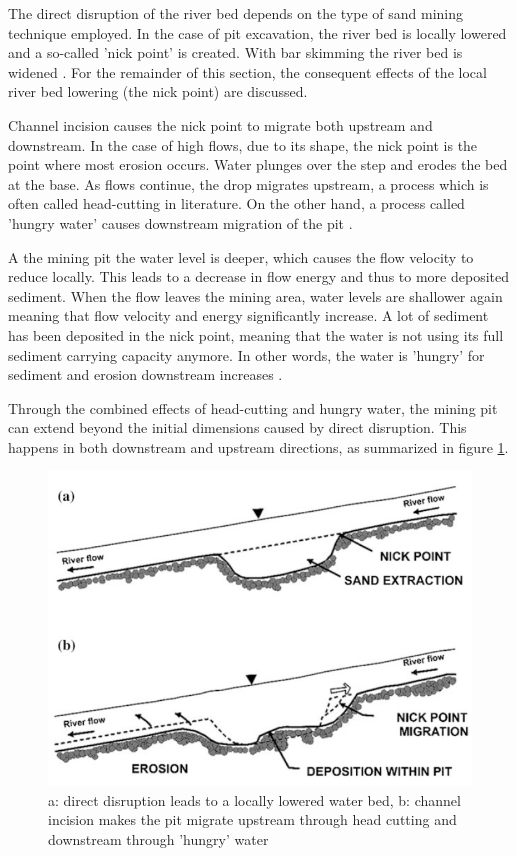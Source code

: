 The direct disruption of the river bed depends on the type of sand mining technique employed. In the case of pit excavation, the river bed is locally lowered and a so-called 'nick point' is created. With bar skimming the river bed is widened \autocite{sand-mining-boek}. For the remainder of this section, the consequent effects of the local river bed lowering (the nick point) are discussed.

Channel incision causes the nick point to migrate both upstream and downstream. In the case of high flows, due to its shape, the nick point is the point where most erosion occurs. Water plunges over the step and erodes the bed at the base. As flows continue, the drop migrates upstream, a process which is often called head-cutting in literature. On the other hand, a process called 'hungry water' causes downstream migration of the pit \autocite{sand-mining-boek}.

A the mining pit the water level is deeper, which causes the flow velocity to reduce locally. This leads to a decrease in flow energy and thus to more deposited sediment. When the flow leaves the mining area, water levels are shallower again meaning that flow velocity and energy significantly increase. A lot of sediment has been deposited in the nick point, meaning that the water is not using its full sediment carrying capacity anymore. In other words, the water is 'hungry' for sediment and erosion downstream increases \autocite{sand-mining-boek}. 

Through the combined effects of head-cutting and hungry water, the mining pit can extend beyond the initial dimensions caused by direct disruption. This happens in both downstream and upstream directions, as summarized in figure \ref{fig:channelbedeffects}.

\begin{figure}[H]
    \centering
    \includegraphics[width=0.75\linewidth]{figures/channelbedeffects.png}
    \caption{a: direct disruption leads to a locally lowered water bed, b: channel incision makes the pit migrate upstream through head cutting and downstream through 'hungry' water \autocite{sand-mining-boek}}
    \label{fig:channelbedeffects}
\end{figure}

